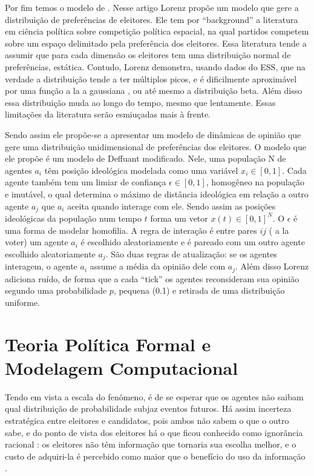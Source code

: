 Por fim temos o modelo de . Nesse artigo Lorenz
propõe um modelo que gere a distribuição de preferências de eleitores. Ele tem
por ``background'' a literatura em ciência política sobre competição política
espacial, na qual partidos competem sobre um espaço delimitado pela preferência
dos eleitores. Essa literatura tende a assumir que para cada dimensão os
eleitores tem uma distribuição normal de preferências, estática. Contudo, Lorenz
demonstra, usando dados do ESS, que na verdade a distribuição tende a
ter
múltiplos picos, e é dificilmente aproximável por uma função a la a gaussiana ,
ou até mesmo a distribuição beta. Além disso essa distribuição muda ao longo do
tempo, mesmo que lentamente. Essas limitações da literatura serão esmiuçadas
mais à frente.

Sendo assim ele propõe-se a apresentar um modelo de dinâmicas de opinião que
gere uma distribuição unidimensional de preferências dos eleitores. O modelo que
ele propõe é um modelo de Deffuant modificado. Nele, uma população N de agentes
$a_i$ têm posição ideológica modelada como uma variável $x_i \in [0,1]$. Cada
agente também tem um limiar de confiança $\epsilon \in [0,1]$, homogêneo na população e
imutável, o qual determina o máximo de distância ideológica em relação a outro
agente $a_j$ que $a_i$ aceita quando interage com ele. Sendo assim as posições
ideológicas da população num tempo $t$ forma um vetor $x(t) \in [0,1]^N$. O $\epsilon$ é
uma forma de modelar homofilia. A regra de interação é entre pares $ij$ ( a la
voter) um agente $a_i$ é escolhido aleatoriamente e é pareado com um outro
agente escolhido aleatoriamente $a_j$. São duas regras de atualização: se os
agentes interagem, o agente $a_i$ assume a média da opinião dele com $a_j$. Além
disso Lorenz adiciona ruído, de forma que a cada ``tick'' os agentes
reconsideram sua opinião segundo uma probabilidade $p$, pequena (0.1) e retirada
de uma distribuição uniforme.

\section{Teoria Política Formal e Modelagem Computacional}



Tendo em vista a  escala do fenômeno, é de se esperar que os agentes não saibam qual
distribuição de probabilidade subjaz eventos futuros. Há assim incerteza
estratégica entre eleitores e candidatos, pois ambos não sabem o que o outro
sabe, e do ponto de vista dos eleitores há o que ficou conhecido como ignorância
racional : os eleitores não têm informação que tornaria sua escolha melhor, e o
custo de adquiri-la é percebido como maior que o benefício do uso da informação
\cite{munger2015choosing}.

